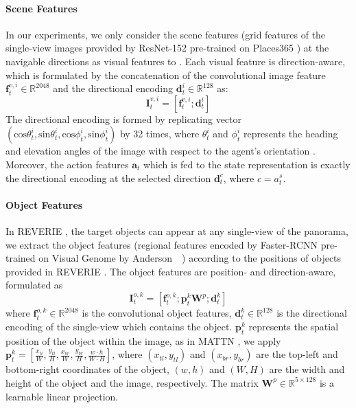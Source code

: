 \documentclass[final]{cvpr}
\begin{document}
\paragraph{Scene Features}
In our experiments, we only consider the scene features (grid features of the single-view images provided by ResNet-152 \cite{he2016deep} pre-trained on Places365 \cite{zhou2017places}) at the navigable directions as visual features to \vlnbert. Each visual feature is direction-aware, which is formulated by the concatenation of the convolutional image feature $\boldsymbol{f}^{v,i}_{t}\in\mathbb{R}^{2048}$ and the directional encoding $\boldsymbol{d}^{i}_{t}\in\mathbb{R}^{128}$ as:
\begin{equation}
\boldsymbol{I}^{v,i}_{t} = \left[\boldsymbol{f}^{v,i}_{t};\boldsymbol{d}^{i}_{t}\right]
\label{eqn:scene_feat}
\end{equation}
The directional encoding is formed by replicating vector $(\text{cos}\theta^{i}_{t}, \text{sin}\theta^{i}_{t}, \text{cos}\phi^{i}_{t}, \text{sin}\phi^{i}_{t})$ by 32 times, where $\theta^{i}_{t}$ and $\phi^{i}_{t}$ represents the heading and elevation angles of the image with respect to the agent's orientation \cite{fried2018speaker, tan2019learning}. Moreover, the action features $\boldsymbol{a}_{t}$ which is fed to the state representation is exactly the directional encoding at the selected direction $\boldsymbol{d}^{c}_{t}$, where $c=a^{s}_{t}$.

\paragraph{Object Features}
In REVERIE \cite{qi2020reverie}, the target objects can appear at any single-view of the panorama, we extract the object features (regional features encoded by Faster-RCNN \cite{ren2015faster} pre-trained on Visual Genome \cite{krishna2017visual} by Anderson~\etal~\cite{anderson2018bottom}) according to the positions of objects provided in REVERIE \cite{qi2020reverie}. The object features are position- and direction-aware, formulated as
\begin{equation}
\boldsymbol{I}^{o,k}_{t} = \left[\boldsymbol{f}^{o,k}_{t};\boldsymbol{p}^{k}_{t}\boldsymbol{W}^{p};\boldsymbol{d}^{k}_{t}\right]
\label{eqn:object_feat}
\end{equation}
where $\boldsymbol{f}^{o,k}_{t}\in\mathbb{R}^{2048}$ is the convolutional object features, $\boldsymbol{d}^{k}_{t}\in\mathbb{R}^{128}$ is the directional encoding of the single-view which contains the object. $\boldsymbol{p}^{k}_{t}$ represents the spatial position of the object within the image, as in MATTN \cite{yu2018mattnet}, we apply $\boldsymbol{p}^{k}_{t}=\left[\frac{x_{tl}}{W},\frac{y_{tl}}{H},\frac{x_{br}}{W},\frac{y_{br}}{H},\frac{w{\cdot}h}{W{\cdot}H}\right]$, where $(x_{tl}, y_{tl})$ and $(x_{br}, y_{br})$ are the top-left and bottom-right coordinates of the object, $(w,h)$ and $(W,H)$ are the width and height of the object and the image, respectively. The matrix $\boldsymbol{W}^{p}\in\mathbb{R}^{5\times128}$ is a learnable linear projection.
\end{document}
